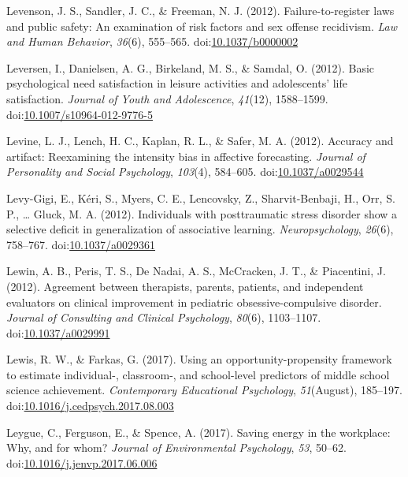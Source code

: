 \documentclass[english,man]{apa6}
\begin{document}
\hypertarget{ref-Levenson2012a}{}
Levenson, J. S., Sandler, J. C., \& Freeman, N. J. (2012).
Failure-to-register laws and public safety: An examination of risk
factors and sex offense recidivism. \emph{Law and Human Behavior},
\emph{36}(6), 555--565.
doi:\href{https://doi.org/10.1037/b0000002}{10.1037/b0000002}

\hypertarget{ref-Leversen2012}{}
Leversen, I., Danielsen, A. G., Birkeland, M. S., \& Samdal, O. (2012).
Basic psychological need satisfaction in leisure activities and
adolescents' life satisfaction. \emph{Journal of Youth and Adolescence},
\emph{41}(12), 1588--1599.
doi:\href{https://doi.org/10.1007/s10964-012-9776-5}{10.1007/s10964-012-9776-5}

\hypertarget{ref-Levine2012}{}
Levine, L. J., Lench, H. C., Kaplan, R. L., \& Safer, M. A. (2012).
Accuracy and artifact: Reexamining the intensity bias in affective
forecasting. \emph{Journal of Personality and Social Psychology},
\emph{103}(4), 584--605.
doi:\href{https://doi.org/10.1037/a0029544}{10.1037/a0029544}

\hypertarget{ref-Levy-Gigi2012}{}
Levy-Gigi, E., Kéri, S., Myers, C. E., Lencovsky, Z., Sharvit-Benbaji,
H., Orr, S. P., \ldots{} Gluck, M. A. (2012). Individuals with
posttraumatic stress disorder show a selective deficit in generalization
of associative learning. \emph{Neuropsychology}, \emph{26}(6), 758--767.
doi:\href{https://doi.org/10.1037/a0029361}{10.1037/a0029361}

\hypertarget{ref-Lewin2012}{}
Lewin, A. B., Peris, T. S., De Nadai, A. S., McCracken, J. T., \&
Piacentini, J. (2012). Agreement between therapists, parents, patients,
and independent evaluators on clinical improvement in pediatric
obsessive-compulsive disorder. \emph{Journal of Consulting and Clinical
Psychology}, \emph{80}(6), 1103--1107.
doi:\href{https://doi.org/10.1037/a0029991}{10.1037/a0029991}

\hypertarget{ref-Lewis2017}{}
Lewis, R. W., \& Farkas, G. (2017). Using an opportunity-propensity
framework to estimate individual-, classroom-, and school-level
predictors of middle school science achievement. \emph{Contemporary
Educational Psychology}, \emph{51}(August), 185--197.
doi:\href{https://doi.org/10.1016/j.cedpsych.2017.08.003}{10.1016/j.cedpsych.2017.08.003}

\hypertarget{ref-Leygue2017}{}
Leygue, C., Ferguson, E., \& Spence, A. (2017). Saving energy in the
workplace: Why, and for whom? \emph{Journal of Environmental
Psychology}, \emph{53}, 50--62.
doi:\href{https://doi.org/10.1016/j.jenvp.2017.06.006}{10.1016/j.jenvp.2017.06.006}
\end{document}
